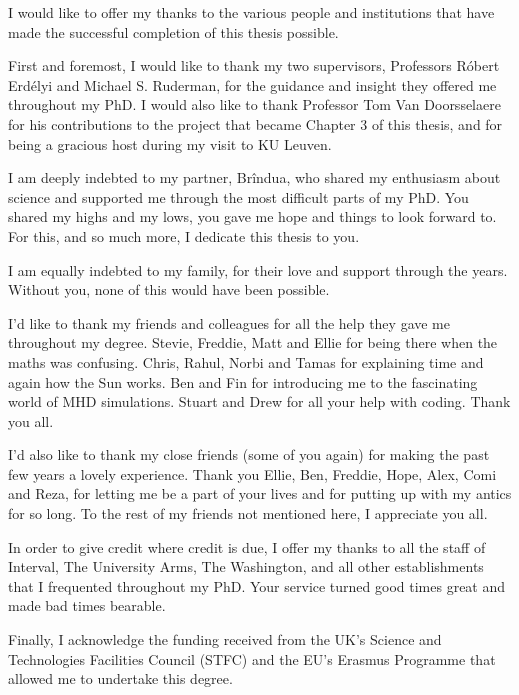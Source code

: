 \begin{acknowledgementslong}

I would like to offer my thanks to the various people and institutions that have made the successful completion of this thesis possible.

First and foremost, I would like to thank my two supervisors, Professors R\'obert Erd\'elyi and Michael S. Ruderman, for the guidance and insight they offered me throughout my PhD.
I would also like to thank Professor Tom Van Doorsselaere for his contributions to the project that became Chapter 3 of this thesis, and for being a gracious host during my visit to KU Leuven.

I am deeply indebted to my partner, Br\^{i}ndua, who shared my enthusiasm about science and supported me through the most difficult parts of my PhD.
You shared my highs and my lows, you gave me hope and things to look forward to.
For this, and so much more, I dedicate this thesis to you.

I am equally indebted to my family, for their love and support through the years.
Without you, none of this would have been possible.

I'd like to thank my friends and colleagues for all the help they gave me throughout my degree.
Stevie, Freddie, Matt and Ellie for being there when the maths was confusing.
Chris, Rahul, Norbi and Tamas for explaining time and again how the Sun works.
Ben and Fin for introducing me to the fascinating world of MHD simulations.
Stuart and Drew for all your help with coding.
Thank you all.

I'd also like to thank my close friends (some of you again) for making the past few years a lovely experience.
Thank you Ellie, Ben, Freddie, Hope, Alex, Comi and Reza, for letting me be a part of your lives and for putting up with my antics for so long.
To the rest of my friends not mentioned here, I appreciate you all.

In order to give credit where credit is due, I offer my thanks to all the staff of Interval, The University Arms, The Washington, and all other establishments that I frequented throughout my PhD.
Your service turned good times great and made bad times bearable.

Finally, I acknowledge the funding received from the UK's Science and Technologies Facilities Council (STFC) and the EU's Erasmus Programme that allowed me to undertake this degree.

\end{acknowledgementslong}